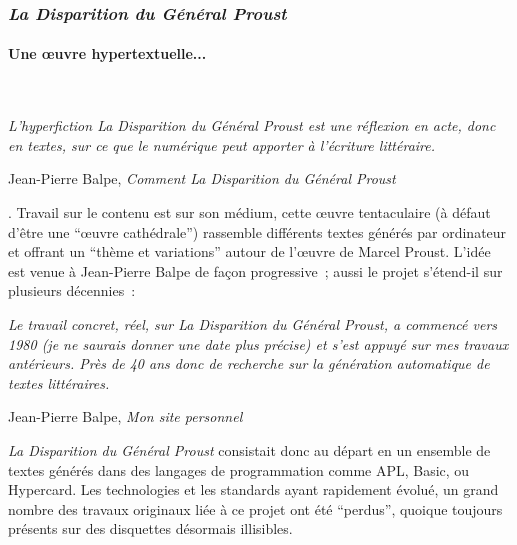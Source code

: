 \documentclass{article}
\newcommand{\subsubsubsection}[1]{\paragraph{#1}\mbox{}\\}
\newenvironment{citationbox}
{\begin{center}
		\begin{minipage}{.8\textwidth}
		}
		{
		\end{minipage}	
\end{center}
}
\begin{document}
			\subsubsection{\textit{La Disparition du Général Proust}}
				\subsubsubsection{Une œuvre hypertextuelle...}
					\begin{citationbox}
						\textit{L'hyperfiction \textit{La Disparition du Général Proust} est une réflexion en acte, donc en textes, sur ce que le numérique peut apporter à l'écriture littéraire.}
						\begin{flushright}
							Jean-Pierre Balpe, \textit{Comment La Disparition du Général Proust} \cite{balpe_blog}
						\end{flushright}
					\end{citationbox}.
					Travail sur le contenu est sur son médium, cette œuvre tentaculaire (à défaut d'être une ``œuvre cathédrale'') rassemble différents textes générés par ordinateur et offrant un ``thème et variations'' autour de l'œuvre de Marcel Proust. L'idée est venue à Jean-Pierre Balpe de façon progressive ; aussi le projet s'étend-il sur plusieurs décennies :
					\begin{citationbox}
						\textit{Le travail concret, réel, sur \textit{La Disparition du Général Proust}, a commencé vers 1980 (je ne saurais donner une date plus précise) et s'est appuyé sur mes travaux antérieurs. Près de 40 ans donc de recherche sur la génération automatique de textes littéraires.}
						\begin{flushright}
							Jean-Pierre Balpe, \textit{Mon site personnel} \cite{balpe_blog}
						\end{flushright}\cite{balpe_blog}
					\end{citationbox}
					\textit{La Disparition du Général Proust} consistait donc au départ en un ensemble de textes générés  dans  des langages de programmation comme APL, Basic, ou Hypercard. Les technologies et les standards ayant rapidement évolué, un grand nombre des travaux originaux liée à ce projet ont été ``perdus'',  quoique toujours présents sur des disquettes désormais illisibles.\\
					
\end{document}
